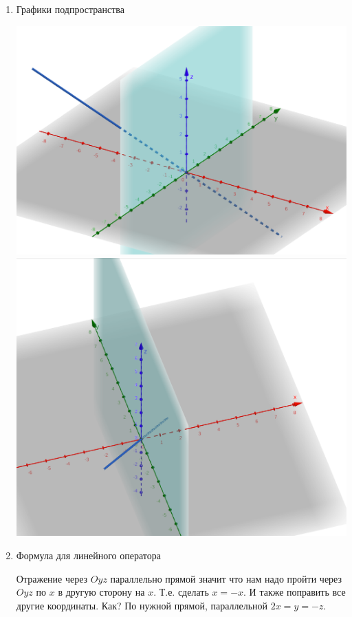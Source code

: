 \begin{enumerate}
    \item Графики подпространства

    \includegraphics[scale=0.15]{images/3a2_1}
    \includegraphics[scale=0.15]{images/3a2_2}

    \item Формула для линейного оператора

    Отражение через $Oyz$ параллельно прямой значит что нам надо пройти через $Oyz$ по $x$ в другую сторону на $x$.
    Т.е. сделать $x=-x$.
    И также поправить все другие координаты. Как? По нужной прямой, параллельной $2x=y=-z$.


\end{enumerate}
